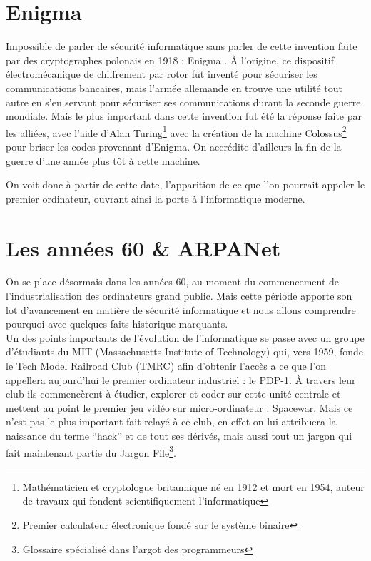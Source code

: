 \documentclass[a4paper]{memoir}
\begin{document}
\section{Enigma}

Impossible de parler de sécurité informatique sans parler de cette invention faite par des cryptographes polonais en 1918 : Enigma .
À l'origine, ce dispositif électromécanique de chiffrement par rotor fut inventé pour sécuriser les communications bancaires, mais l'armée allemande en trouve une utilité tout autre en s'en servant pour sécuriser ses communications durant la seconde guerre mondiale. Mais le plus important dans cette invention fut été la réponse faite par les alliées, avec l'aide d'Alan Turing\footnote{Mathématicien et cryptologue britannique né en 1912 et mort en 1954, auteur de travaux qui fondent scientifiquement l'informatique} avec la création de la machine Colossus\footnote{Premier calculateur électronique fondé sur le système binaire} pour briser les codes provenant d'Enigma. On accrédite d'ailleurs la fin de la guerre d'une année plus tôt à cette machine.

On voit donc à partir de cette date, l'apparition de ce que l'on pourrait appeler le premier ordinateur, ouvrant ainsi la porte à l'informatique moderne.

\section{Les années 60 \& ARPANet}

On se place désormais dans les années 60, au moment du commencement de l'industrialisation des ordinateurs grand public. Mais cette période apporte son lot d'avancement en matière de sécurité informatique et nous allons comprendre pourquoi avec quelques faits historique marquants.\\

Un des points importants de l'évolution de l'informatique se passe avec un groupe d'étudiants du MIT (Massachusetts Institute of Technology) qui, vers 1959, fonde le Tech Model Railroad Club (TMRC) afin d'obtenir l'accès a ce que l'on appellera aujourd'hui le premier ordinateur industriel : le PDP-1. À travers leur club ils commencèrent à étudier, explorer et coder sur cette unité centrale et mettent au point le premier jeu vidéo sur micro-ordinateur : Spacewar. Mais ce n'est pas le plus important fait relayé à ce club, en effet on lui attribuera la naissance du terme ``hack'' et de tout ses dérivés, mais aussi tout un jargon qui fait maintenant partie du Jargon File\footnote{Glossaire spécialisé dans l'argot des programmeurs}.\\
\end{document}
